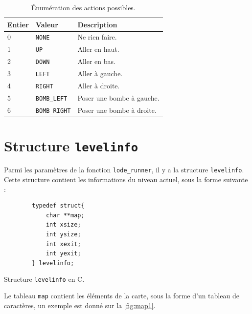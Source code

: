\begin{table}[!htpb]
    \label{tab:enum-action}
    \begin{tabularx}{\textwidth}{lXX}
        \toprule
        \textbf{Entier} & \textbf{Valeur} & \textbf{Description} \\
        \midrule
        0 & \texttt{NONE} & Ne rien faire. \\
        1 & \texttt{UP} & Aller en haut. \\
        2 & \texttt{DOWN} & Aller en bas. \\
        3 & \texttt{LEFT} & Aller à gauche. \\
        4 & \texttt{RIGHT} & Aller à droite. \\
        5 & \texttt{BOMB\_LEFT} & Poser une bombe à gauche. \\
        6 & \texttt{BOMB\_RIGHT} & Poser une bombe à droite. \\
        \bottomrule
    \end{tabularx}
    \caption{Énumération des actions possibles.}
\end{table}

\newpage

\section{Structure \texttt{levelinfo}}

Parmi les paramètres de la fonction \texttt{lode\_runner}, il y a la structure \texttt{levelinfo}.
Cette structure contient les informations du niveau actuel, sous la forme suivante :

\begin{listing}[!htpb]
    \begin{verbatim}
        typedef struct{
            char **map;
            int xsize;
            int ysize;
            int xexit;
            int yexit;
        } levelinfo;
    \end{verbatim}
    \caption{Structure \texttt{levelinfo} en C.}
    \label{listing:c-levelinfo-struct}
\end{listing}

Le tableau \texttt{map} contient les éléments de la carte, sous la forme d'un tableau de caractères, un exemple est donné sur la \autoref{fig:map1}.

